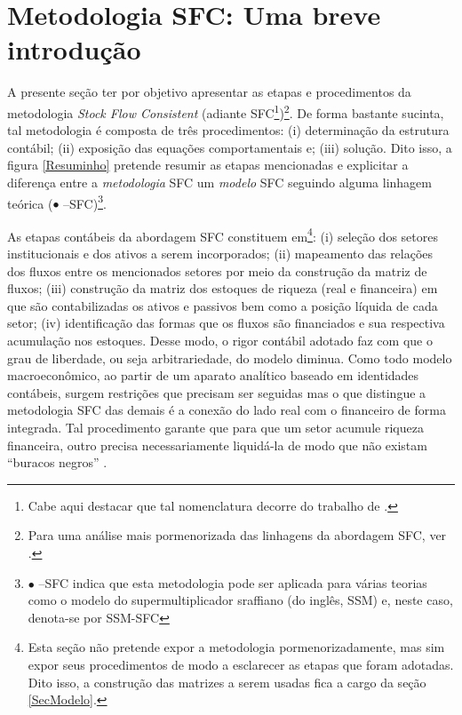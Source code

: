 \section{Metodologia SFC: Uma breve introdução}
\label{IntroSFC}


A presente seção ter por objetivo apresentar as etapas e procedimentos da metodologia \textit{Stock Flow Consistent} (adiante SFC\footnote{Cabe aqui destacar que tal nomenclatura decorre do trabalho de \textcite{dos_santos_keynesian_2006}.})\footnote{Para uma análise mais pormenorizada das linhagens da abordagem SFC, ver \textcite{caverzasi_stock-flow_2013}.}. De forma bastante sucinta, tal metodologia é composta de três procedimentos: (i) determinação da estrutura contábil; (ii) exposição das equações comportamentais e; (iii) solução. Dito isso, a figura \ref{Resuminho} pretende resumir as etapas mencionadas e explicitar a diferença entre a \textit{metodologia} SFC um \textit{modelo} SFC seguindo alguma linhagem teórica ($\bullet$ --SFC)\footnote{
	$\bullet$ --SFC indica que esta metodologia pode ser aplicada para várias teorias como o modelo do supermultiplicador sraffiano (do inglês, SSM) e, neste caso, denota-se por SSM-SFC
}. 



As etapas contábeis da abordagem SFC constituem em\footnote{Esta seção não pretende expor a metodologia pormenorizadamente, mas sim expor seus procedimentos de modo a esclarecer as etapas que foram adotadas. Dito isso, a construção das matrizes a serem usadas fica a cargo da seção \ref{SecModelo}.}: (i) seleção dos setores institucionais e dos ativos a serem incorporados; (ii) mapeamento das relações dos fluxos entre os mencionados setores por meio da construção da matriz de fluxos; (iii) construção da matriz dos estoques de riqueza (real e financeira) em que são contabilizadas os ativos e passivos  bem como a posição líquida de cada setor; (iv) identificação das formas que os fluxos são financiados e sua respectiva acumulação nos estoques. Desse modo, o rigor contábil adotado faz com que o grau de liberdade, ou seja arbitrariedade, do modelo diminua. Como todo modelo macroeconômico, ao partir de um aparato analítico baseado em identidades contábeis, surgem restrições que precisam ser seguidas mas o que distingue a metodologia SFC das demais é a conexão do lado real com o financeiro de forma integrada.
Tal procedimento garante que para que um setor acumule riqueza financeira, outro precisa necessariamente liquidá-la de modo que não existam ``buracos negros'' \cite{godley_money_1996}.

